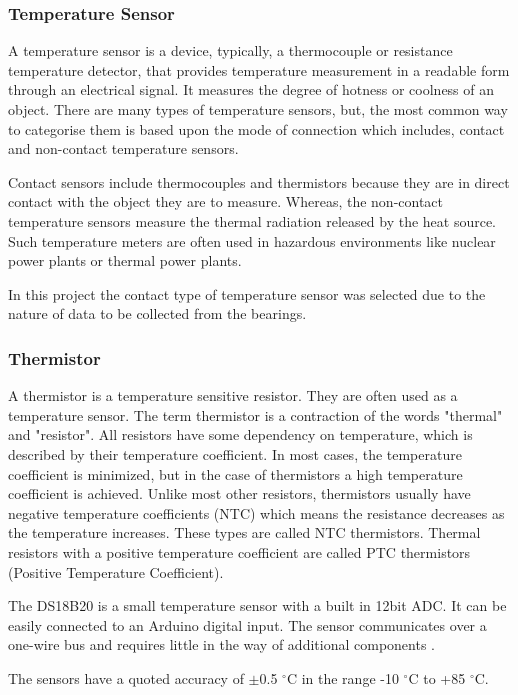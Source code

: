 \subsubsection{Temperature Sensor}
A temperature sensor is a device, typically, a thermocouple or resistance temperature detector, that provides temperature measurement in a readable form through an electrical signal. It measures the degree of hotness or coolness of an object. There are many types of temperature sensors, but, the most common way to categorise them is based upon the mode of connection which includes, contact and non-contact temperature sensors\cite{noauthor_temperature_2019}. 

Contact sensors include thermocouples and thermistors because they are in direct contact with the object they are to measure. Whereas, the non-contact temperature sensors measure the thermal radiation released by the heat source. Such temperature meters are often used in hazardous environments like nuclear power plants or thermal power plants. 

In this project the contact type of temperature sensor was selected due to the nature of data to be collected from the bearings. 
\subsubsection{Thermistor}
A thermistor is a temperature sensitive resistor. They are often used as a temperature sensor. The term thermistor is a contraction of the words "thermal" and "resistor". All resistors have some dependency on temperature, which is described by their temperature coefficient. In most cases, the temperature coefficient is minimized, but in the case of thermistors a high temperature coefficient is achieved. Unlike most other resistors, thermistors usually have negative temperature coefficients (NTC) which means the resistance decreases as the temperature increases. These types are called NTC thermistors. Thermal resistors with a positive temperature coefficient are called PTC thermistors (Positive Temperature Coefficient).

The DS18B20 is a small temperature sensor with a built in 12bit ADC. It can be easily connected to an Arduino digital input. The sensor communicates over a one-wire bus and requires little in the way of additional components \cite{noauthor_learn_nodate}.

The sensors have a quoted accuracy of $\pm$0.5 $^{\circ}$C in the range -10 $^{\circ}$C to +85 $^{\circ}$C.

